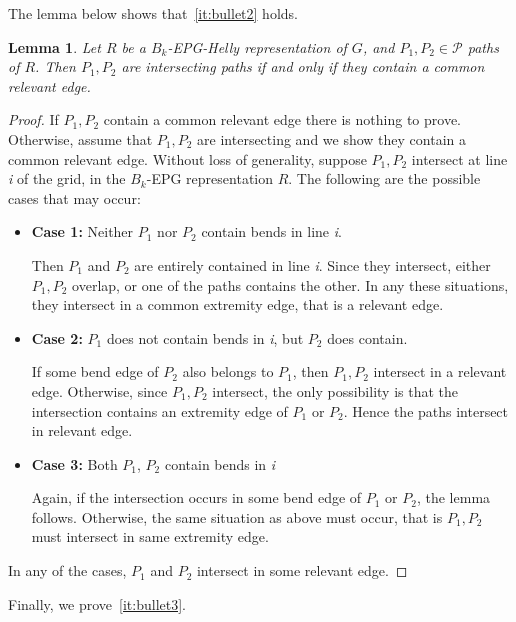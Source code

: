 \documentclass[preprint,12pt]{elsarticle} %
\newtheorem{lema}[theorem]{Lemma}
\begin{document}
The lemma below shows that~\ref{it:bullet2} holds.

\begin{lema}\label{lem:relevantEdges}
Let $R$ be a $B_k$-EPG-Helly representation of $G$, and $P_1, P_2 \in \mathcal{P}$ paths of $R$. Then $P_1, P_2$ are intersecting paths if and only if they contain a common relevant edge.
\end{lema}


\begin{proof}
If $P_1, P_2$ contain a common relevant edge there is nothing to prove. Otherwise, assume that $P_1, P_2$ are intersecting and we show they contain a common relevant edge. Without loss of generality, suppose $P_1, P_2$ intersect at line \textit{i} of the grid, in the  $B_k$-EPG representation $R$. The following are the possible cases that may occur:

\begin{itemize}
\item \textbf{Case 1:} Neither $P_1$ nor $P_2$ contain bends in line \textit{i}. 

Then $P_1$ and $ P_2$  are entirely contained in line \textit{i}. Since they intersect, either $P_1, P_2$  overlap, or one of the paths contains the other. In any these situations, they intersect in a common extremity edge, that is a relevant edge.

\item \textbf{Case 2:} $P_1$ does not contain bends in \textit{i}, but $ P_2$ does contain.

If some bend edge of $P_2$ also belongs to $P_1$, then $P_1, P_2$  intersect in  a relevant edge. Otherwise, since $P_1, P_2$  intersect, the only possibility is that the intersection contains an extremity edge of $P_1$ or $ P_2$. Hence the paths intersect in relevant edge.  

\item \textbf{Case 3:} Both $P_1$,  $P_2$ contain bends in \textit{i}

Again, if the intersection occurs in some bend edge of $P_1$  or $P_2$, the lemma follows. Otherwise, the same situation as above must occur, that is $P_1, P_2$  must intersect in same extremity edge.
 
\end{itemize}
In any of the cases, $P_1$ and $P_2$ intersect in some relevant edge.
\end{proof}

Finally, we prove~\ref{it:bullet3}.

\end{document}

